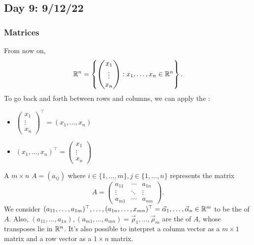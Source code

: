 \documentclass[main.tex]{subfiles}
\begin{document}
\subsection{Day 9: 9/12/22}

\subsubsection{Matrices}
From now on,
\[\mathbb R^n = \left\{\begin{pmatrix} x_1 \\ \vdots \\ x_n\end{pmatrix} : x_1, \ldots , x_n\in \mathbb R^n\right\}.\]
To go back and forth between rows and columns, we can apply the :
\begin{itemize}
    \item $\begin{pmatrix} x_1 \\ \vdots \\ x_n\end{pmatrix}^\top = (x_1, \ldots , x_n)$
    \item $(x_1 , \ldots , x_n)^\top = \begin{pmatrix} x_1 \\ \vdots \\ x_n\end{pmatrix}$
\end{itemize}

\begin{definition}[Matrix]
    A $m\times n$  $A = (a_{ij})$ where $i\in \{1, \ldots , m\}, j\in \{1, \ldots , n\}$ represents the matrix
    \[A = \begin{pmatrix}
    a_{11} & \cdots & a_{1n} \\
    \vdots & \ddots & \vdots \\
    a_{m1} & \cdots & a_{mn}
    \end{pmatrix}.\]
    We consider $(a_{11}, \ldots , a_{1m})^\top, \ldots , (a_{1n}, \ldots , x_{mn})^\top = \vec{\alpha}_1, \ldots , \vec{\alpha}_n\in \mathbb R^m$ to be the  of $A$. Also, $(a_{11} , \ldots , a_{1n}), (a_{m1} , \ldots , a_{mn}) = \vec{\rho}_1, \ldots , \vec{\rho}_m$ are the  of $A$, whose transposes lie in $\mathbb R^n$. It's also possible to interpret a column vector as a $m\times 1$ matrix and a row vector as a $1\times n$ matrix.
\end{definition}
\end{document}
